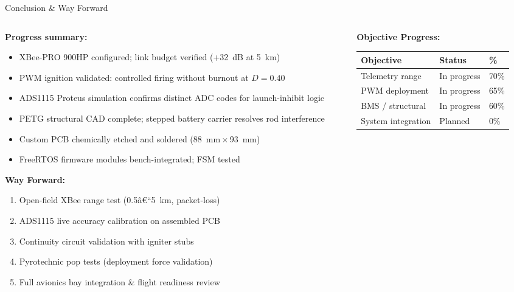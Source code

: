 \documentclass[aspectratio=169, 11pt]{beamer}
\begin{document}
\begin{frame}{Conclusion \& Way Forward}
\begin{columns}[T]
  \begin{column}{0.54\textwidth}
    \textbf{Progress summary:}
    \begin{itemize}
      \item XBee-PRO 900HP configured; link budget verified (+32~dB at 5~km)
      \item PWM ignition validated: controlled firing without burnout at $D=0.40$
      \item ADS1115 Proteus simulation confirms distinct ADC codes for launch-inhibit logic
      \item PETG structural CAD complete; stepped battery carrier resolves rod interference
      \item Custom PCB chemically etched and soldered (88~mm\,$\times$\,93~mm)
      \item FreeRTOS firmware modules bench-integrated; FSM tested
    \end{itemize}
    \vspace{0.4em}
    \textbf{Way Forward:}
    \begin{enumerate}\setlength{\itemsep}{1pt}
      \item Open-field XBee range test (0.5â€“5~km, packet-loss)
      \item ADS1115 live accuracy calibration on assembled PCB
      \item Continuity circuit validation with igniter stubs
      \item Pyrotechnic pop tests (deployment force validation)
      \item Full avionics bay integration \& flight readiness review
    \end{enumerate}
  \end{column}
  \begin{column}{0.43\textwidth}
    \centering
    \textbf{Objective Progress:}\\[4pt]
    \begin{tabular}{@{}lll@{}}
      \toprule
      \textbf{Objective} & \textbf{Status} & \textbf{\%}\\
      \midrule
      Telemetry range    & In progress & 70\% \\
      PWM deployment     & In progress & 65\% \\
      BMS / structural   & In progress & 60\% \\
      System integration & Planned     & 0\%  \\
      \bottomrule
    \end{tabular}
  \end{column}
\end{columns}
\end{frame}
\end{document}
